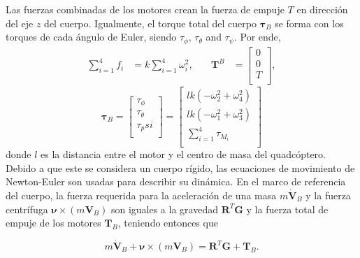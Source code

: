 \documentclass[11pt]{exam}
\begin{document}
        Las fuerzas combinadas de los motores crean la fuerza de empuje $T$ en direcci\'on del eje $z$ del cuerpo. Igualmente, el torque total del cuerpo $\boldsymbol{\tau}_B$ se forma con los torques de cada \'angulo de Euler, siendo $\tau_{\phi}$, $\tau_{\theta}$ and $\tau_{\psi}$. Por ende,
        \begin{align}
            \sum_{i=1}^4 f_i &= k \sum_{i=1}^4 \omega_i^2, &\quad \boldsymbol{T}^B &= 
            \left[{
                \begin{array}{c}
                    0 \\
                    0 \\
                    T \\
                \end{array} 
            }\right],
        \end{align}
        \begin{equation}
            \boldsymbol{\tau}_B = 
            \left[{
                \begin{array}{c}
                    \tau_\phi \\
                    \tau_\theta \\
                    \tau_psi \\
                \end{array} 
            }\right] = 
            \left[{
                \begin{array}{c}
                    lk\left(-\omega_2^2 + \omega_4^2 \right) \\
                    lk\left(-\omega_1^2 + \omega_3^2\right) \\
                    \sum_{i = 1}^{4}\tau_{M_i} \\
                \end{array} 
            }\right]
        \end{equation}
        donde $l$ es la distancia entre el motor y el centro de masa del quadc\'optero. Debido a que este se considera un cuerpo rígido, las ecuaciones de movimiento de Newton-Euler son usadas para describir su dinámica. En el marco de referencia del cuerpo, la fuerza requerida para la aceleraci\'on de una masa $m\dot{\boldsymbol{V}}_B$ y la fuerza centr\'ifuga $\boldsymbol{\nu}\times(m\boldsymbol{V}_B)$ son iguales a la gravedad $\boldsymbol{R}^T\boldsymbol{G}$ y la fuerza total de empuje de los motores $\boldsymbol{T}_B$, teniendo entonces que

        \begin{equation}
            m\dot{\boldsymbol{V}}_B + \boldsymbol{\nu}\times(m\boldsymbol{V}_B) = \boldsymbol{R}^T\boldsymbol{G} + \boldsymbol{T}_B.
        \end{equation}
\end{document}
